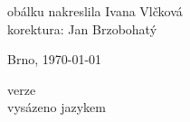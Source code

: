 \vspace*{\fill}
\hspace{10mm}obálku nakreslila Ivana Vlčková\\
korektura: Jan Brzobohatý\\
\begin{otherlanguage}{czech}
Brno, \today\\
\end{otherlanguage}
verze \zpversion\\
vysázeno jazykem \LaTeXe\par
\vspace{8mm}

\vspace{2cm}
\newpage

